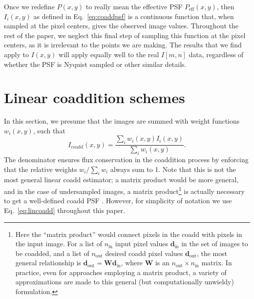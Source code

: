 \documentclass{aastex63}
\newcommand{\mike}[1]{{\color{cyan}MJ: #1}}
\newcommand{\irresponse}[1]{{#1}}
\begin{document}


Once we redefine $P(x,y)$ to really mean the effective PSF $P_\text{eff}(x,y)$, then $I_i(x,y)$ as defined in Eq.~\eqref{eq:coaddpsf} is a continuous function that, when sampled at the pixel centers, gives the observed image values.
Throughout the rest of the paper, we neglect this final step of sampling this function at the pixel centers, as it is irrelevant to the points we are making.  The results that we find apply to $I(x,y)$ will apply equally \irresponse{well} to the real $I[m,n]$ data, regardless of whether the PSF is Nyquist sampled or other similar details.

\section{Linear coaddition schemes}\label{sec:lin}

In this section, we presume that the images are summed with weight functions $w_i(x,y)$, such that
\begin{equation}\label{eq:lincoadd}
    I_\text{coadd}(x,y) = \frac{\sum_i w_i(x,y) I_i(x,y)}{\sum_i w_i(x,y)}.
\end{equation}
The denominator ensures flux conservation in the coaddition process by enforcing that the relative weights $w_i/\sum_i w_i$ always sum to 1. Note that this is not the most general linear coadd estimator; a matrix product would be more general, and in the case of undersampled images, a matrix product\footnote{Here the ``matrix product'' would connect pixels in the coadd with pixels in the input image.  For a list of $n_\text{in}$ input pixel values $\mathbf{d}_\text{in}$ in the set of images to be coadded, and a list of $n_\text{out}$ desired coadd pixel values $\mathbf{d}_\text{out}$, the most general relationship is $\mathbf{d}_\text{out} = \mathbf{W} \mathbf{d}_\text{in}$, where $\mathbf{W}$ is an $n_\text{out}\times n_\text{in}$ matrix.  In practice, even for approaches employing a matrix product, a variety of approximations are made to this general (but computationally unwieldy) formulation.} is actually necessary to get a well-defined coadd PSF \citep{2011ApJ...741...46R}.  However, for simplicity of notation we use Eq.~\eqref{eq:lincoadd} throughout this paper.
\end{document}
